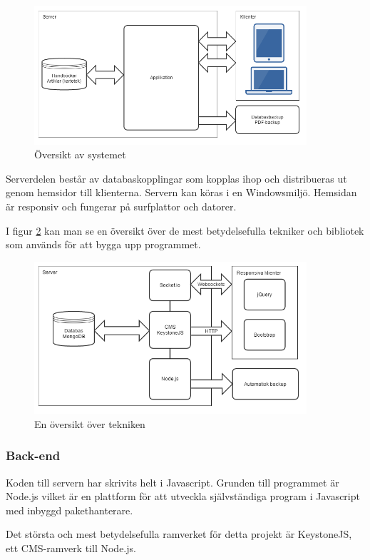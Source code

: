 \begin{figure}[htbp]
  \centering
  \includegraphics[width=0.9\textwidth]{images/overview.png}
  \caption{Översikt av systemet}
  \label{fig:overview}
\end{figure}
Serverdelen består av databaskopplingar som kopplas ihop och distribueras ut genom hemsidor till klienterna. Servern kan köras i en Windowsmiljö. Hemsidan är responsiv och fungerar på surfplattor och datorer.


I figur \ref{fig:techoverview} kan man se en översikt över de mest betydelsefulla tekniker och bibliotek som används för att bygga upp programmet.
\begin{figure}
  \centering
  \includegraphics[width=0.9\textwidth]{images/techoverview.png}
  \caption{En översikt över tekniken}
  \label{fig:techoverview}
\end{figure}
\subsubsection{Back-end}
Koden till servern har skrivits helt i Javascript.
Grunden till programmet är Node.js vilket är en plattform för att utveckla självständiga program i Javascript med inbyggd pakethanterare.

Det största och mest betydelsefulla ramverket för detta projekt är KeystoneJS, ett CMS-ramverk till Node.js.

